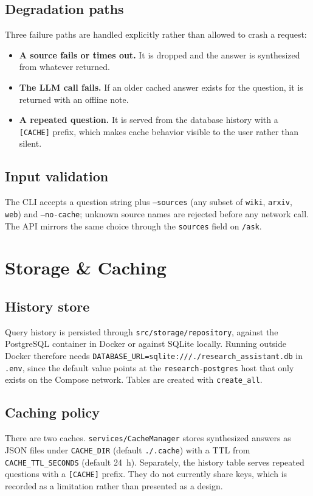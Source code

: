 \documentclass[11pt,a4paper]{article}
\newcommand{\code}[1]{\texttt{\small #1}}
\begin{document}
\subsection{Degradation paths}
Three failure paths are handled explicitly rather than allowed to crash a
request:
\begin{itemize}[leftmargin=1.4em,itemsep=2pt]
  \item \textbf{A source fails or times out.} It is dropped and the answer is
        synthesized from whatever returned.
  \item \textbf{The LLM call fails.} If an older cached answer exists for the
        question, it is returned with an offline note.
  \item \textbf{A repeated question.} It is served from the database history
        with a \code{[CACHE]} prefix, which makes cache behavior visible to the
        user rather than silent.
\end{itemize}

\subsection{Input validation}
The CLI accepts a question string plus \code{--sources} (any subset of
\code{wiki}, \code{arxiv}, \code{web}) and \code{--no-cache}; unknown source
names are rejected before any network call. The API mirrors the same choice
through the \code{sources} field on \code{/ask}.

\section{Storage \& Caching}

\subsection{History store}
Query history is persisted through \code{src/storage/repository}, against the
PostgreSQL container in Docker or against SQLite locally. Running outside Docker
therefore needs \code{DATABASE\_URL=sqlite:///./research\_assistant.db} in
\code{.env}, since the default value points at the \code{research-postgres} host
that only exists on the Compose network. Tables are created with
\code{create\_all}.

\subsection{Caching policy}
There are two caches. \code{services/CacheManager} stores synthesized answers as
JSON files under \code{CACHE\_DIR} (default \code{./.cache}) with a TTL from
\code{CACHE\_TTL\_SECONDS} (default 24~h). Separately, the history table serves
repeated questions with a \code{[CACHE]} prefix. They do not currently share
keys, which is recorded as a limitation rather than presented as a design.
\end{document}

